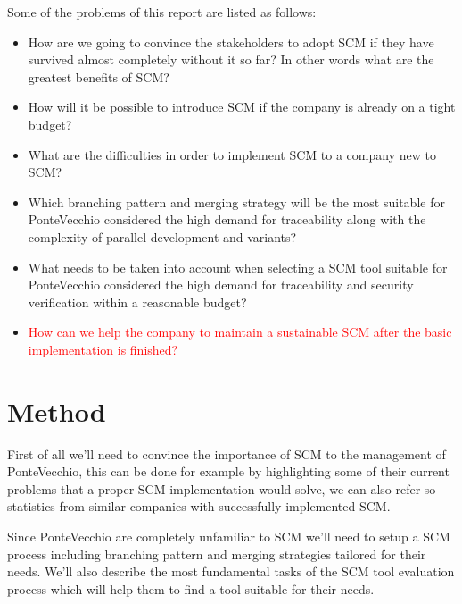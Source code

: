 \documentclass[10pt]{article}
\newcommand\remove[1]{\textcolor{red}{#1}}
\begin{document}
\hfill \break
\noindent Some of the problems of this report are  listed as follows:
\begin{itemize}
\item How are we going to convince the stakeholders to adopt SCM if they have survived almost completely without it so far? In other words what are the greatest benefits of SCM?
\item How will it be possible to introduce SCM if the company is already on a tight budget?
\item What are the difficulties in order to implement SCM to a company new to SCM?
\item Which branching pattern and merging strategy will be the most suitable for PonteVecchio considered the high demand for traceability along with the complexity of parallel development and variants?
\item What needs to be taken into account when selecting a SCM tool suitable for PonteVecchio considered the high demand for traceability and security verification within a reasonable budget?
\item \remove{How can we help the company to maintain a sustainable SCM after the basic implementation is finished?} 
\end{itemize}

\section{Method}
First of all we’ll need to convince the importance of SCM to the management of PonteVecchio, this can be done for example by highlighting some of their current problems that a proper SCM implementation would solve, we can also refer so statistics from similar companies with successfully implemented SCM.

\noindent Since PonteVecchio are completely unfamiliar to SCM we’ll need to setup a SCM process including branching pattern and merging strategies tailored for their needs. We’ll also describe the most fundamental tasks of the SCM tool evaluation process which will help them to find a tool suitable for their needs.
\end{document}
